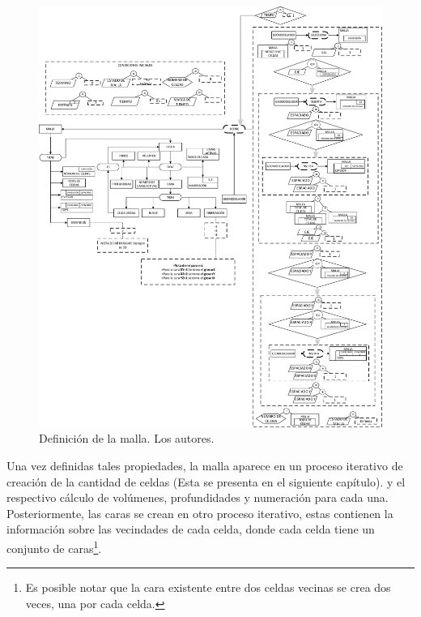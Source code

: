 \begin{figure}[h]
	\centering%
	\includegraphics[width=0.9\linewidth]{Fig/Mesh.pdf}%
	\caption[Definición de la malla.]{Definición de la malla. Los autores.} \label{fig:Mesh}
\end{figure}

Una vez definidas tales propiedades, la malla aparece en un proceso iterativo de creación de la cantidad de celdas (Esta se presenta en el siguiente capítulo). y el respectivo cálculo de volúmenes, profundidades y numeración para cada una. Posteriormente, las caras se crean en otro proceso iterativo, estas contienen la información sobre las vecindades de cada celda, donde cada celda tiene un conjunto de caras\footnote{Es posible notar que la cara existente entre dos celdas vecinas se crea dos veces, una por cada celda.}. 


